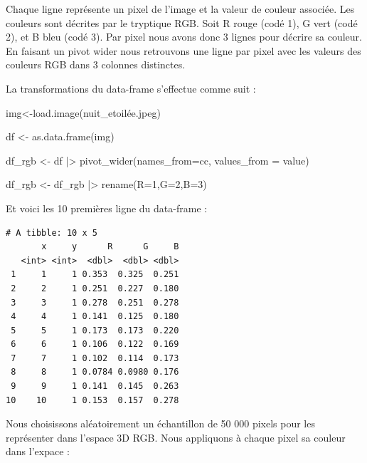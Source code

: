 \documentclass{article}
\newenvironment{Shaded}{\begin{snugshade}}{\end{snugshade}}
\newcommand{\AttributeTok}[1]{\textcolor[rgb]{0.40,0.45,0.13}{#1}}
\newcommand{\FunctionTok}[1]{\textcolor[rgb]{0.28,0.35,0.67}{#1}}
\newcommand{\NormalTok}[1]{\textcolor[rgb]{0.00,0.23,0.31}{#1}}
\newcommand{\OtherTok}[1]{\textcolor[rgb]{0.00,0.23,0.31}{#1}}
\newcommand{\SpecialCharTok}[1]{\textcolor[rgb]{0.37,0.37,0.37}{#1}}
\newcommand{\StringTok}[1]{\textcolor[rgb]{0.13,0.47,0.30}{#1}}
\begin{document}
Chaque ligne représente un pixel de l'image et la valeur de couleur
associée. Les couleurs sont décrites par le tryptique RGB. Soit R rouge
(codé 1), G vert (codé 2), et B bleu (codé 3). Par pixel nous avons donc
3 lignes pour décrire sa couleur. En faisant un pivot wider nous
retrouvons une ligne par pixel avec les valeurs des couleurs RGB dans 3
colonnes distinctes.

La transformations du data-frame s'effectue comme suit :

\begin{Shaded}
\begin{Highlighting}[]
\NormalTok{img}\OtherTok{\textless{}{-}}\FunctionTok{load.image}\NormalTok{(}\StringTok{\textquotesingle{}nuit\_etoilée.jpeg\textquotesingle{}}\NormalTok{)}

\NormalTok{df }\OtherTok{\textless{}{-}} \FunctionTok{as.data.frame}\NormalTok{(img)}

\NormalTok{df\_rgb }\OtherTok{\textless{}{-}}\NormalTok{ df }\SpecialCharTok{|\textgreater{}} \FunctionTok{pivot\_wider}\NormalTok{(}\AttributeTok{names\_from=}\NormalTok{cc, }\AttributeTok{values\_from =}\NormalTok{ value)}

\NormalTok{df\_rgb }\OtherTok{\textless{}{-}}\NormalTok{ df\_rgb }\SpecialCharTok{|\textgreater{}} \FunctionTok{rename}\NormalTok{(}\AttributeTok{R=}\StringTok{\textquotesingle{}1\textquotesingle{}}\NormalTok{,}\AttributeTok{G=}\StringTok{\textquotesingle{}2\textquotesingle{}}\NormalTok{,}\AttributeTok{B=}\StringTok{\textquotesingle{}3\textquotesingle{}}\NormalTok{)}
\end{Highlighting}
\end{Shaded}

Et voici les 10 premières ligne du data-frame :

\begin{verbatim}
# A tibble: 10 x 5
       x     y      R      G     B
   <int> <int>  <dbl>  <dbl> <dbl>
 1     1     1 0.353  0.325  0.251
 2     2     1 0.251  0.227  0.180
 3     3     1 0.278  0.251  0.278
 4     4     1 0.141  0.125  0.180
 5     5     1 0.173  0.173  0.220
 6     6     1 0.106  0.122  0.169
 7     7     1 0.102  0.114  0.173
 8     8     1 0.0784 0.0980 0.176
 9     9     1 0.141  0.145  0.263
10    10     1 0.153  0.157  0.278
\end{verbatim}

Nous choisissons aléatoirement un échantillon de 50 000 pixels pour les
représenter dans l'espace 3D RGB. Nous appliquons à chaque pixel sa
couleur dans l'expace :
\end{document}
